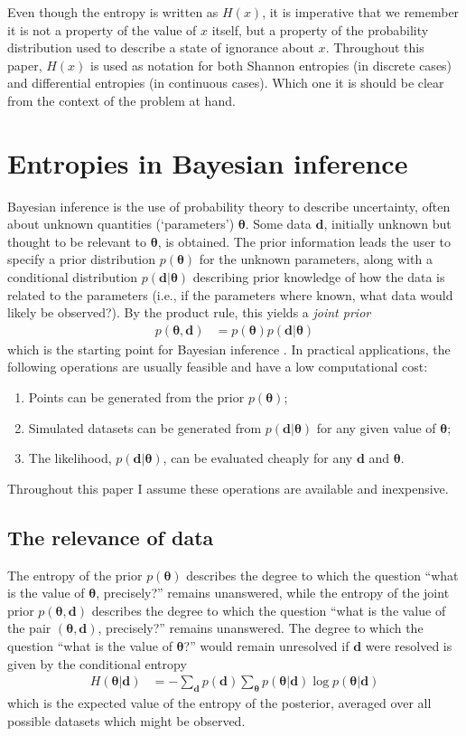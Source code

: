 \documentclass[entropy,article,accept,oneauthor,pdftex,10pt,a4paper]{mdpi}
\renewcommand{\d}{\boldsymbol{d}}
\newcommand{\x}{\boldsymbol{\theta}}
\begin{document}
Even though the entropy is written as $H(x)$, it is imperative that we
remember it is not a property of the value of $x$ itself, but a property
of the probability distribution used to describe a state of ignorance about $x$.
Throughout this paper, $H(x)$ is used as notation for both Shannon entropies
(in discrete cases) and differential entropies (in continuous cases). Which
one it is should be clear from the context of the problem at hand.

\section{Entropies in Bayesian inference}

Bayesian inference is the use of probability theory to
describe uncertainty, often about unknown quantities
(`parameters') $\x$. Some data $\d$, initially unknown but
thought to be relevant to $\x$, is obtained.
The prior information leads the
user to specify a prior distribution $p(\x)$ for the unknown parameters,
along with a conditional distribution $p(\d | \x)$ describing prior knowledge
of how the data is related to the parameters
(i.e., if the parameters where known, what data would likely be observed?).
By the product rule, this yields a {\em joint prior}
\begin{align}
p(\x, \d) &= p(\x)p(\d | \x)
\end{align}
which is the starting point for
Bayesian inference \citep{caticha2008lectures}.
In practical applications, the following operations
are usually feasible and have a low computational cost:
\begin{enumerate}
  \item Points can be generated from the prior $p(\x)$;
  \item Simulated datasets can be generated from $p(\d | \x)$ for any
        given value of $\x$;
  \item The likelihood, $p(\d | \x)$, can be evaluated cheaply for any
        $\d$ and $\x$.
\end{enumerate}
Throughout this paper I assume these operations are available and inexpensive.

\subsection{The relevance of data}

The entropy of the prior $p(\x)$ describes the degree to which the question
``what is the value of $\x$, precisely?'' remains unanswered, while the
entropy of the joint prior $p(\x, \d)$
describes the degree to which the question
``what is the value of the pair $(\x, \d)$, precisely?'' remains unanswered.
The degree to which the question ``what is the value of $\x$?'' would remain
unresolved if $\d$ were resolved is given by the
conditional entropy
\begin{align}
H(\x | \d) &= - \sum_{\d} p(\d) \sum_{\x} p(\x | \d) \log p(\x | \d)
\end{align}
which is the expected value of the entropy of the posterior, averaged over
all possible datasets which might be observed. 
\end{document}
